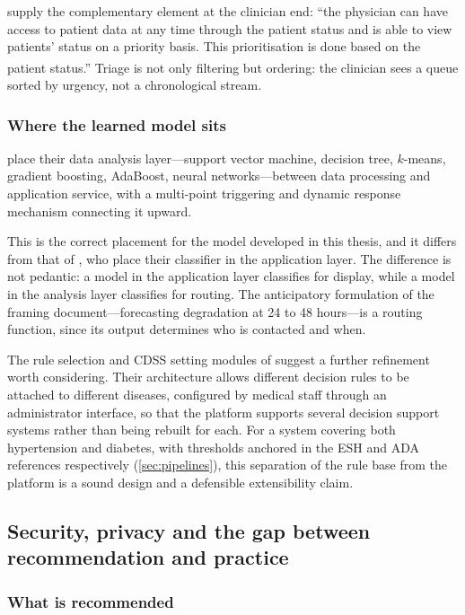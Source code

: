 \documentclass[12pt,a4paper,oneside]{report}
\newcommand{\bq}[1]{``#1''\textsuperscript{\dag}}
\begin{document}
\Textcite{yazdani2018} supply the complementary element at the clinician end: \bq{the physician can have access to patient data at any time through the patient status and is able to view patients' status on a priority basis. This prioritisation is done based on the patient status.} Triage is not only filtering but ordering: the clinician sees a queue sorted by urgency, not a chronological stream.

\subsubsection{Where the learned model sits}

\Textcite{liu2025review} place their data analysis layer---support vector machine, decision tree, $k$-means, gradient boosting, AdaBoost, neural networks---between data processing and application service, with a multi-point triggering and dynamic response mechanism connecting it upward.

This is the correct placement for the model developed in this thesis, and it differs from that of \textcite{efendi2025}, who place their classifier in the application layer. The difference is not pedantic: a model in the application layer classifies for display, while a model in the analysis layer classifies for routing. The anticipatory formulation of the framing document---forecasting degradation at 24 to 48 hours---is a routing function, since its output determines who is contacted and when.

The rule selection and CDSS setting modules of \textcite{yazdani2018} suggest a further refinement worth considering. Their architecture allows different decision rules to be attached to different diseases, configured by medical staff through an administrator interface, so that the platform supports several decision support systems rather than being rebuilt for each. For a system covering both hypertension and diabetes, with thresholds anchored in the ESH and ADA references respectively (\cref{sec:pipelines}), this separation of the rule base from the platform is a sound design and a defensible extensibility claim.

\subsection{Security, privacy and the gap between recommendation and practice}\label{sec:security}

\subsubsection{What is recommended}
\end{document}
